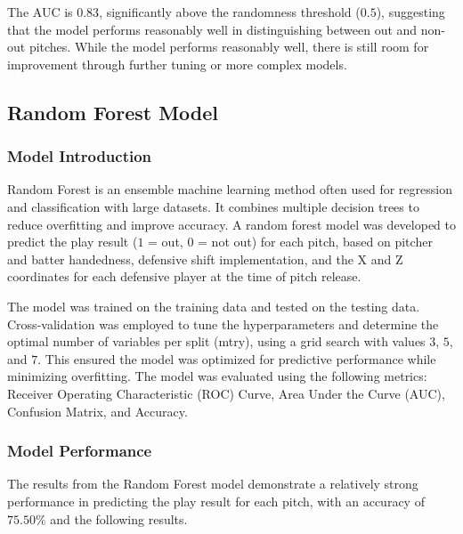 \documentclass{article}
\begin{document}
The AUC is $0.83$, significantly above the randomness threshold ($0.5$), suggesting that the model performs reasonably well in distinguishing between out and non-out pitches. While the model performs reasonably well, there is still room for improvement through further tuning or more complex models.


\subsection{Random Forest Model}
\subsubsection{Model Introduction}
Random Forest is an ensemble machine learning method often used for regression and classification with large datasets. It combines multiple decision trees to reduce overfitting and improve accuracy. A random forest model was developed to predict the play result ($1$ = out, $0$ = not out) for each pitch, based on pitcher and batter handedness, defensive shift implementation, and the X and Z coordinates for each defensive player at the time of pitch release.

The model was trained on the training data and tested on the testing data. Cross-validation was employed to tune the hyperparameters and determine the optimal number of variables per split (mtry), using a grid search with values $3$, $5$, and $7$. This ensured the model was optimized for predictive performance while minimizing overfitting. The model was evaluated using the following metrics: Receiver Operating Characteristic (ROC) Curve, Area Under the Curve (AUC), Confusion Matrix, and Accuracy. 

\subsubsection{Model Performance}

The results from the Random Forest model demonstrate a relatively strong performance in predicting the play result for each pitch, with an accuracy of $75.50\%$ and the following results. 
\end{document}
